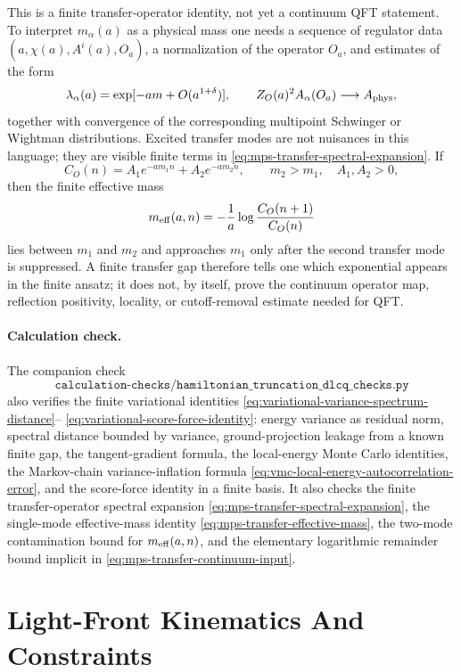 This is a finite transfer-operator identity, not yet a continuum QFT
statement.  To interpret \(m_\alpha(a)\) as a physical mass one needs a
sequence of regulator data \((a,\chi(a),A^i(a),O_a)\), a normalization of the
operator \(O_a\), and estimates of the form
\begin{equation}
  \lambda_\alpha(a)
  =
  \exp[-a m+O(a^{1+\delta})],
  \qquad
  Z_O(a)^2 A_\alpha(O_a)\longrightarrow A_{\rm phys},
  \label{eq:mps-transfer-continuum-input}
\end{equation}
together with convergence of the corresponding multipoint Schwinger or
Wightman distributions.  Excited transfer modes are not nuisances in this
language; they are visible finite terms in
\eqref{eq:mps-transfer-spectral-expansion}.  If
\[
  C_O(n)=A_1e^{-a m_1n}+A_2e^{-a m_2n},
  \qquad m_2>m_1,\quad A_1,A_2>0,
\]
then the finite effective mass
\[
  m_{\rm eff}(a,n)
  =
  -\frac1a\log\frac{C_O(n+1)}{C_O(n)}
\]
lies between \(m_1\) and \(m_2\) and approaches \(m_1\) only after the
second transfer mode is suppressed.  A finite transfer gap therefore tells
one which exponential appears in the finite ansatz; it does not, by itself,
prove the continuum operator map, reflection positivity, locality, or
cutoff-removal estimate needed for QFT.

\paragraph{Calculation check.}
The companion check
\[
  \texttt{calculation-checks/hamiltonian\_truncation\_dlcq\_checks.py}
\]
also verifies the finite variational identities
\eqref{eq:variational-variance-spectrum-distance}--
\eqref{eq:variational-score-force-identity}: energy variance as residual
norm, spectral distance bounded by variance, ground-projection leakage from a
known finite gap, the tangent-gradient formula, the local-energy
Monte Carlo identities, the Markov-chain variance-inflation formula
\eqref{eq:vmc-local-energy-autocorrelation-error}, and the score-force identity
in a finite basis.  It also checks the finite
transfer-operator spectral expansion
\eqref{eq:mps-transfer-spectral-expansion}, the single-mode effective-mass
identity \eqref{eq:mps-transfer-effective-mass}, the two-mode contamination
bound for \(m_{\rm eff}(a,n)\), and the elementary logarithmic remainder
bound implicit in \eqref{eq:mps-transfer-continuum-input}.

\section{Light-Front Kinematics And Constraints}
\label{sec:light-front-kinematic-constraint-datum}

